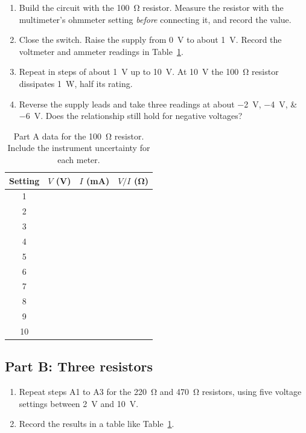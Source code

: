 \documentclass[11pt]{article}
\begin{document}
\begin{enumerate}[label=A\arabic*.]
  \item Build the circuit with the \SI{100}{\ohm} resistor. Measure the resistor with the multimeter's ohmmeter setting \emph{before} connecting it, and record the value.
  \item Close the switch. Raise the supply from \SI{0}{\volt} to about \SI{1}{\volt}. Record the voltmeter and ammeter readings in Table~\ref{tab:partA}.
  \item Repeat in steps of about \SI{1}{\volt} up to \SI{10}{\volt}. At \SI{10}{\volt} the \SI{100}{\ohm} resistor dissipates \SI{1}{\watt}, half its rating.
  \item Reverse the supply leads and take three readings at about \SIlist{-2;-4;-6}{\volt}. Does the relationship still hold for negative voltages?
\end{enumerate}

\begin{table}[H]
  \centering
  \caption{Part A data for the \SI{100}{\ohm} resistor. Include the instrument uncertainty for each meter.}
  \label{tab:partA}
  \begin{tabular}{c c c c}
    \toprule
    Setting & $V$ (\si{\volt}) & $I$ (\si{\milli\ampere}) & $V/I$ (\si{\ohm}) \\
    \midrule
    1  & & & \\
    2  & & & \\
    3  & & & \\
    4  & & & \\
    5  & & & \\
    6  & & & \\
    7  & & & \\
    8  & & & \\
    9  & & & \\
    10 & & & \\
    \bottomrule
  \end{tabular}
\end{table}

\subsection*{Part B: Three resistors}

\begin{enumerate}[label=B\arabic*.]
  \item Repeat steps A1 to A3 for the \SI{220}{\ohm} and \SI{470}{\ohm} resistors, using five voltage settings between \SI{2}{\volt} and \SI{10}{\volt}.
  \item Record the results in a table like Table~\ref{tab:partA}.
\end{enumerate}
\end{document}
